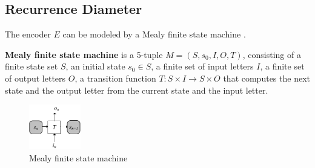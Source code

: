 \documentclass[journal]{IEEEtran}
\begin{document}
%




\subsection{Recurrence Diameter}\label{subsec_recdia}

The encoder $E$ can be modeled by a Mealy finite state machine \cite{MEALY}.

\begin{definition11}\label{MealyFSM}%
\textbf{Mealy finite state machine} is a 5-tuple $M=(S,s_0,I,O,T)$,
consisting of a finite state set $S$,
an initial state $s_0\in S$,
a finite set of input letters $I$,
a finite set of output letters $O$,
a transition function $T: S\times I\to S\times O$ that computes the next state and the output letter from the current state and the input letter.
\end{definition11}
\begin{figure}[t]
\begin{center}
\includegraphics[width=0.20\textwidth]{mealy}
\end{center}
\caption{Mealy finite state machine}
  \label{mealy}
\end{figure}
\end{document}
